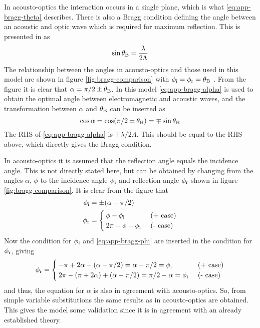 \documentclass[11pt,twoside]{eitExjobb}
\begin{document}
	In acousto-optics the interaction occurs in a single plane, which is what \eqref{eq:app-bragg-theta} describes. There is also a Bragg condition defining the angle between an acoustic and optic wave which is required for maximum reflection. This is presented in \cite{Saleh2007} as
	\begin{equation*}
		\sin{\theta_{\mathrm{B}}} = \frac{\lambda}{2\Lambda}
	\end{equation*}
	The relationship between the angles in acousto-optics and those used in this model are shown in figure \ref{fig:bragg-comparison} with $\phi_{\mathrm{i}} = \phi_{\mathrm{r}} = \theta_{\mathrm{B}}$ \cite{Saleh2007}. From the figure it is clear that $\alpha = \pi/2 \pm \theta_{\mathrm{B}}$. In this model \eqref{eq:app-bragg-alpha} is used to obtain the optimal angle between electromagnetic and acoustic waves, and the transformation between $\alpha$ and $\theta_{\mathrm{B}}$ can be inserted as
	\begin{equation*}
		\cos{\alpha} = \cos(\pi/2 \pm \theta_{\mathrm{B}}) = \mp \sin{\theta_{\mathrm{B}}}
	\end{equation*}
	The RHS of \eqref{eq:app-bragg-alpha} is $\mp \lambda/2\Lambda$. This should be equal to the RHS above, which directly gives the Bragg condition.
	
	In acousto-optics it is assumed that the reflection angle equals the incidence angle. This is not directly stated here, but can be obtained by changing from the angles $\alpha$, $\phi$ to the incidence angle $\phi_{\mathrm{i}}$ and reflection angle $\phi_{\mathrm{r}}$ shown in figure \ref{fig:bragg-comparison}. It is clear from the figure that
	\begin{align*}
		\phi_{\mathrm{i}} &= \pm(\alpha - \pi/2) \\
		\phi_{\mathrm{r}} &=
		\begin{cases}
			\phi - \phi_{\mathrm{i}} &\text{ (+ case)} \\
			2\pi - \phi - \phi_{\mathrm{i}} &\text{ (- case)}
		\end{cases}
	\end{align*}
	Now the condition for $\phi_{\mathrm{i}}$ and \eqref{eq:app-bragg-phi} are inserted in the condition for $\phi_{\mathrm{r}}$, giving
	\begin{equation*}
		\phi_{\mathrm{r}} =
		\begin{cases}
			-\pi + 2\alpha - (\alpha - \pi/2) = \alpha - \pi/2 = \phi_{\mathrm{i}} &\text{ (+ case)}\\
			2\pi - (\pi + 2\alpha) + (\alpha - \pi/2) = \pi/2 - \alpha = \phi_{\mathrm{i}} &\text{ (- case)}
		\end{cases}
	\end{equation*}
	and thus, the equation for $\alpha$ is also in agreement with acousto-optics. So, from simple variable substitutions the same results as in acousto-optics are obtained. This gives the model some validation since it is in agreement with an already established theory.
	
\end{document}
